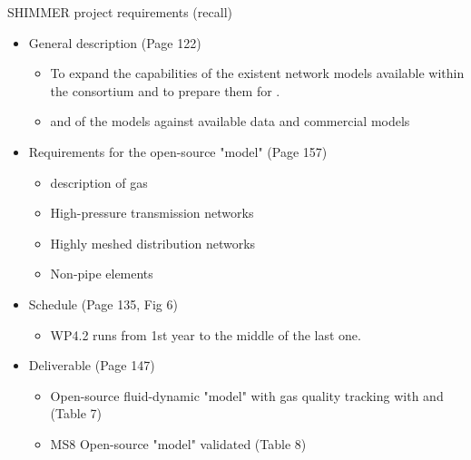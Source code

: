 
\begin{frame}{SHIMMER project requirements (recall)}
\begin{itemize}
\item General description (Page 122)
	\begin{itemize}
    		\item To expand the capabilities of the existent network models available within the consortium and to prepare them for . 
    		\item {} and  of the models against available data and commercial models
	\end{itemize}
\item Requirements for the open-source "model"  (Page 157)
	\begin{itemize}		
	     \item {} description of gas 
	     \item High-pressure transmission networks
	     \item Highly meshed distribution networks 
	     \item Non-pipe elements
   	\end{itemize}
\item Schedule (Page 135, Fig 6) 
	\begin{itemize}
    \item WP4.2 runs from 1st year to the middle of the last one. 
	\end{itemize}

\item Deliverable (Page 147)
	\begin{itemize}
    \item  Open-source fluid-dynamic "model" with gas quality tracking with  and  (Table 7)
    \item {} MS8 Open-source "model" validated  (Table 8)
	\end{itemize}
\end{itemize}


\end{frame}
